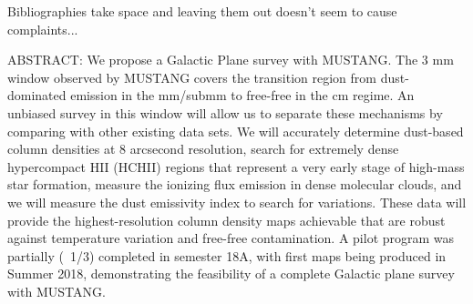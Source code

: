 \documentclass[11pt,preprint]{aastex_nofoot}
\begin{document}

\clearpage
{\color{red} Bibliographies take space and leaving them out doesn't seem to cause complaints...}
\footnotesize\raggedright
\noindent 
%

\normalsize
%


ABSTRACT:
We propose a Galactic Plane survey with MUSTANG.  The 3 mm window observed by
MUSTANG covers the transition region from dust-dominated emission in the
mm/submm to free-free in the cm regime.  An unbiased survey in this window will
allow us to separate these mechanisms by comparing with other existing data
sets.  We will accurately determine dust-based column densities at 8 arcsecond
resolution,  search for extremely dense hypercompact HII (HCHII) regions that
represent a very early stage of high-mass star formation, measure the ionizing
flux emission in dense molecular clouds, and we will measure the
dust emissivity index to search for variations. These data will provide the
highest-resolution column density maps achievable that are robust against
temperature variation and free-free contamination.  A pilot program was
partially (~1/3) completed in semester 18A, with first maps being produced in
Summer 2018, demonstrating the feasibility of a complete Galactic plane survey
with MUSTANG.


\end{document}

